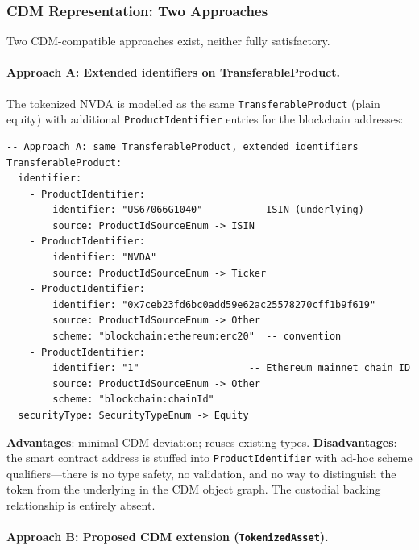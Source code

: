 \documentclass[11pt,a4paper]{article}
\begin{document}
\subsubsection{CDM Representation: Two Approaches}
\label{sec:cdm-tokenized-representation}

Two CDM-compatible approaches exist, neither fully satisfactory.

\paragraph{Approach A: Extended identifiers on TransferableProduct.}

The tokenized NVDA is modelled as the same \texttt{TransferableProduct} (plain equity) with additional \texttt{ProductIdentifier} entries for the blockchain addresses:

\begin{lstlisting}
-- Approach A: same TransferableProduct, extended identifiers
TransferableProduct:
  identifier:
    - ProductIdentifier:
        identifier: "US67066G1040"        -- ISIN (underlying)
        source: ProductIdSourceEnum -> ISIN
    - ProductIdentifier:
        identifier: "NVDA"
        source: ProductIdSourceEnum -> Ticker
    - ProductIdentifier:
        identifier: "0x7ceb23fd6bc0add59e62ac25578270cff1b9f619"
        source: ProductIdSourceEnum -> Other
        scheme: "blockchain:ethereum:erc20"  -- convention
    - ProductIdentifier:
        identifier: "1"                   -- Ethereum mainnet chain ID
        source: ProductIdSourceEnum -> Other
        scheme: "blockchain:chainId"
  securityType: SecurityTypeEnum -> Equity
\end{lstlisting}

\noindent\textbf{Advantages}: minimal CDM deviation; reuses existing types. \textbf{Disadvantages}: the smart contract address is stuffed into \texttt{ProductIdentifier} with ad-hoc scheme qualifiers---there is no type safety, no validation, and no way to distinguish the token from the underlying in the CDM object graph. The custodial backing relationship is entirely absent.

\paragraph{Approach B: Proposed CDM extension (\texttt{TokenizedAsset}).}
\end{document}
